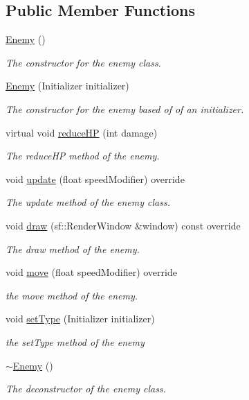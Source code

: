\subsection*{Public Member Functions}
\begin{DoxyCompactItemize}
\item 
\hyperlink{class_enemy_a94f30d348b6d2840fd71675472ba38dd}{Enemy} ()
\begin{DoxyCompactList}\small\item\em The constructor for the enemy class. \end{DoxyCompactList}\item 
\hyperlink{class_enemy_a46078d479d4ca128752f2676fb2f5321}{Enemy} (Initializer initializer)
\begin{DoxyCompactList}\small\item\em The constructor for the enemy based of of an initializer. \end{DoxyCompactList}\item 
virtual void \hyperlink{class_enemy_a5545e77e51c4c03309a02eba5573ff73}{reduce\+H\+P} (int damage)
\begin{DoxyCompactList}\small\item\em The reduce\+H\+P method of the enemy. \end{DoxyCompactList}\item 
void \hyperlink{class_enemy_a5509b06f70a649c4ea9d1fb06f07cb5c}{update} (float speed\+Modifier) override
\begin{DoxyCompactList}\small\item\em The update method of the enemy class. \end{DoxyCompactList}\item 
void \hyperlink{class_enemy_ad35cb50c7b041a183f12756b939a4636}{draw} (sf\+::\+Render\+Window \&window) const override
\begin{DoxyCompactList}\small\item\em The draw method of the enemy. \end{DoxyCompactList}\item 
void \hyperlink{class_enemy_aa70fd228db393894a6cd941e067f1aad}{move} (float speed\+Modifier) override
\begin{DoxyCompactList}\small\item\em the move method of the enemy. \end{DoxyCompactList}\item 
void \hyperlink{class_enemy_ab33e544c241dffc381b7c3614f8c0438}{set\+Type} (Initializer initializer)
\begin{DoxyCompactList}\small\item\em the set\+Type method of the enemy \end{DoxyCompactList}\item 
\hyperlink{class_enemy_ac0eec4755e28c02688065f9657150ac3}{$\sim$\+Enemy} ()
\begin{DoxyCompactList}\small\item\em The deconstructor of the enemy class. \end{DoxyCompactList}\end{DoxyCompactItemize}
